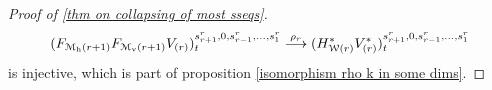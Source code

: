 \documentclass[11pt]{amsart}
\theoremstyle{plain}
\theoremstyle{definition}
\renewcommand{\to}{\longrightarrow}
\newcommand{\calW}{\mathcal{W}}
\newcommand{\calV}{\mathcal{V}}
\newcommand{\calM}{\mathcal{M}}
\theoremstyle{plain}
\newcommand{\vect}[2]{\calV^{#1}_{#2}}
\newcommand{\UEAX}{\overline{X}'}%
\newcommand{\Sq}{\mathrm{Sq}}
\begin{document}
\begin{Calculations of HWn for n nonzero}
\begin{proof}[Proof of \ref{thm on collapsing of most sseqs}]
\[(F_{\calM_{\textup{h}}(r+1)}F_{\calM_{\textup{v}}(r+1)}V_{(r)})^{s_{r+1}^{r},0,s_{r-1}^{r},\ldots,s_1^{r}}_{t} \overset{\rho_r}{\to}(H_{\calW(r)}^{*}V^{*}_{(r)})^{s_{r+1}^{r},0,s_{r-1}^{r},\ldots,s_1^{r}}_{t}\]
is injective, which is part of proposition \ref{isomorphism rho k in some dims}.
%
\end{proof}

\end{Calculations of HWn for n nonzero}
\end{document}
